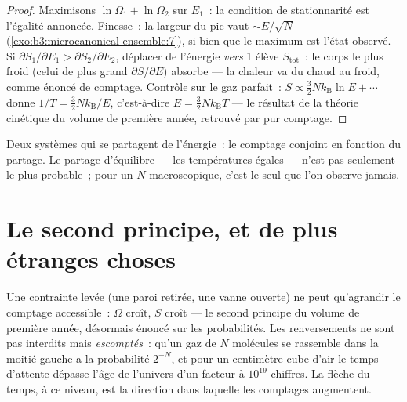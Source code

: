 \begin{proof}
Maximisons $\ln\Omega_1 + \ln\Omega_2$ sur $E_1$~: la condition de
stationnarité est l'égalité annoncée. Finesse~: la largeur du pic vaut
$\sim E/\sqrt N$ (\cref{exo:b3:microcanonical-ensemble:7}), si bien
que le maximum est l'état observé. Si $\partial S_1/\partial E_1 >
\partial S_2/\partial E_2$, déplacer de l'énergie \emph{vers} 1 élève
$S_{\text{tot}}$~: le corps le plus froid (celui de plus grand
$\partial S/\partial E$) absorbe --- la chaleur va du chaud au froid,
comme énoncé de comptage. Contrôle sur le gaz parfait~:
$S \propto \tfrac32 Nk_{\text{B}}\ln E + \cdots$ donne
$1/T = \tfrac32 Nk_{\text{B}}/E$, c'est-à-dire $E = \tfrac32
Nk_{\text{B}}T$ --- le résultat de la théorie cinétique du volume de
première année, retrouvé par pur comptage.
\end{proof}

\begin{omfigure}

{\small Deux systèmes qui se partagent de l'énergie~: le comptage
conjoint en fonction du partage. Le partage d'équilibre --- les
températures égales --- n'est pas seulement le plus probable~; pour un
$N$ macroscopique, c'est le seul que l'on observe jamais.}
\end{omfigure}

\section{Le second principe, et de plus étranges choses}

\begin{proposition}\label{prop:b3:microcanonical-ensemble:second-law}
Une contrainte levée (une paroi retirée, une vanne ouverte) ne peut
qu'agrandir le comptage accessible~: $\Omega$ croît, $S$ croît --- le
second principe du volume de première année, désormais énoncé sur les
probabilités. Les renversements ne sont pas interdits mais
\emph{escomptés}~: qu'un gaz de $N$ molécules se rassemble dans la
moitié gauche a la probabilité $2^{-N}$, et pour un centimètre cube
d'air le temps d'attente dépasse l'âge de l'univers d'un facteur à
$10^{19}$ chiffres. La flèche du temps, à ce niveau, est la direction
dans laquelle les comptages augmentent.
\end{proposition}

